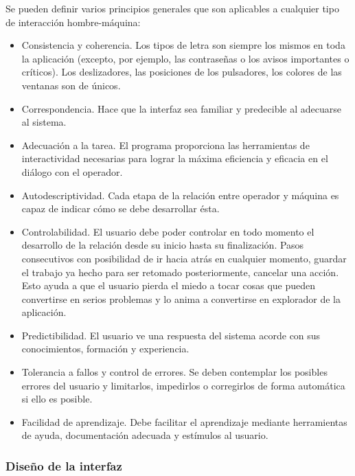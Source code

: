 Se pueden definir varios principios generales que son aplicables a cualquier tipo de interacción hombre-máquina:
\begin{itemize}
    \item Consistencia y coherencia. Los tipos de letra son siempre los mismos en toda la aplicación (excepto, por ejemplo, las contraseñas o los avisos importantes o críticos). Los deslizadores, las posiciones de los pulsadores, los colores de las ventanas son de únicos.
    \item Correspondencia. Hace que la interfaz sea familiar y predecible al adecuarse al sistema.
    \item Adecuación a la tarea. El programa proporciona las herramientas de interactividad necesarias para lograr la máxima eficiencia y eficacia en el diálogo con el operador.
    \item Autodescriptividad. Cada etapa de la relación entre operador y máquina es capaz de indicar cómo se debe desarrollar ésta.
    \item Controlabilidad. El usuario debe poder controlar en todo momento el desarrollo de la relación desde su inicio hasta su finalización. Pasos consecutivos con posibilidad de ir hacia atrás en cualquier momento, guardar el trabajo ya hecho para ser retomado posteriormente, cancelar una acción. Esto ayuda a que el usuario pierda el miedo a tocar cosas que pueden convertirse en serios problemas y lo anima a convertirse en explorador de la aplicación.
    \item Predictibilidad. El usuario ve una respuesta del sistema acorde con sus conocimientos, formación y experiencia.
    \item Tolerancia a fallos y control de errores. Se deben contemplar los posibles errores del usuario y limitarlos, impedirlos o corregirlos de forma automática si ello es posible.
    \item Facilidad de aprendizaje. Debe facilitar el aprendizaje mediante herramientas de ayuda, documentación adecuada y estímulos al usuario.
\end{itemize}

\newpage
\subsubsection{Diseño de la interfaz}

